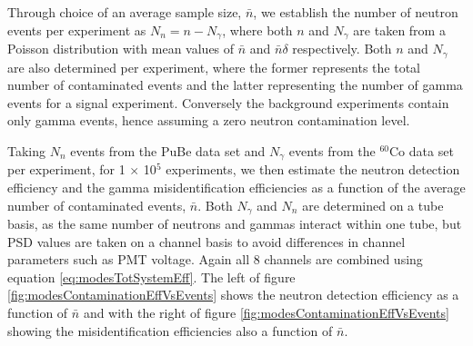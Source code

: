 Through choice of an average sample size, $\bar{n}$, we establish the number of neutron events per experiment as $N_{n}= n - N_{\gamma}$, where both $n$ and $N_{\gamma}$ are taken from a Poisson distribution with mean values of $\bar{n}$ and $\bar{n}\delta$ respectively. Both $n$ and $N_{\gamma}$ are also determined per experiment, where the former represents the total number of contaminated events and the latter representing the number of gamma events for a signal experiment. Conversely the background experiments contain only gamma events, hence assuming a zero neutron contamination level. 

Taking $N_{n}$ events from the PuBe data set and $N_{\gamma}$ events from the $^{60}$Co data set per experiment, for 1 $\times$ 10$^{5}$ experiments, we then estimate the neutron detection efficiency and the gamma misidentification efficiencies as a function of the average number of contaminated events, $\bar{n}$. Both $N_{\gamma}$ and $N_{n}$ are determined on a tube basis, as the same number of neutrons and gammas interact within one tube, but PSD values are taken on a channel basis to avoid differences in channel parameters such as PMT voltage. Again all 8 channels are combined using equation \ref{eq:modesTotSystemEff}. The left of figure \ref{fig:modesContaminationEffVsEvents} shows the neutron detection efficiency as a function of $\bar{n}$ and with the right of figure \ref{fig:modesContaminationEffVsEvents} showing the misidentification efficiencies also a function of $\bar{n}$.

